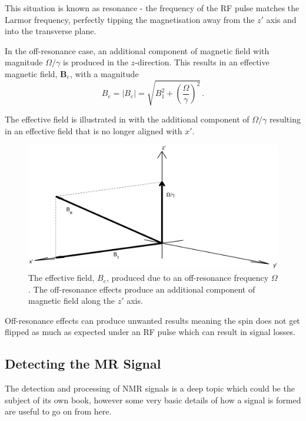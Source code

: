This situation is known as resonance - the frequency of the \ac{RF} pulse matches the Larmor frequency, perfectly tipping the magnetisation away from the $z'$ axis and into the transverse plane. 

In the off-resonance case, an additional component of magnetic field with magnitude $\Omega/\gamma$ is produced in the $z$-direction.
This results in an effective magnetic field, $\mathbf{B}_e$, with a magnitude \cite{DeGraaf2007}
\begin{equation}
	B_e = |B_e| = \sqrt{B_1^2 + \left(\frac{\Omega}{\gamma}\right)^2}\,.
	\label{eq:Beff}
\end{equation}

The effective field is illustrated in  with the additional component of $\Omega/\gamma$ resulting in an effective field that is no longer aligned with $x'$.
\begin{figure}
	\centering
	\includegraphics[width=\textwidth]{figures/background/B_e.eps}
	\caption[The effective field, $B_e$, produced due to an off-resonance frequency $\Omega$.] {The effective field, $B_e$, produced due to an off-resonance frequency $\Omega$. The off-resonance effects produce an additional component of magnetic field along the $z'$ axis.}
	\label{fig:B_e}	
\end{figure}
Off-resonance effects can produce unwanted results meaning the spin does not get flipped as much as expected under an \ac{RF} pulse which can result in signal losses. 
 

\subsection{Detecting the MR Signal}
The detection and processing of \ac{NMR} signals is a deep topic which could be the subject of its own book, however some very basic details of how a signal is formed are useful to go on from here.
 
